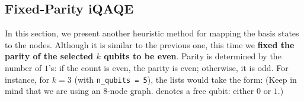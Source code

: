





\subsection{Fixed-Parity iQAQE}
\label{subsection:Fixed-Parity_iQAQE}


In this section, we present another heuristic method for mapping the basis states to the nodes. Although it is similar to the previous one, this time we \textbf{fixed the parity of the selected $k$ qubits to be even}. Parity is determined by the number of $1$'s: if the count is even, the parity is even; otherwise, it is odd. For instance, for $k=3$ (with \texttt{n\_qubits = 5}), the lists would take the form: (Keep in mind that we are using an $8$-node graph.  denotes a free qubit: either $0$ or $1$.)


